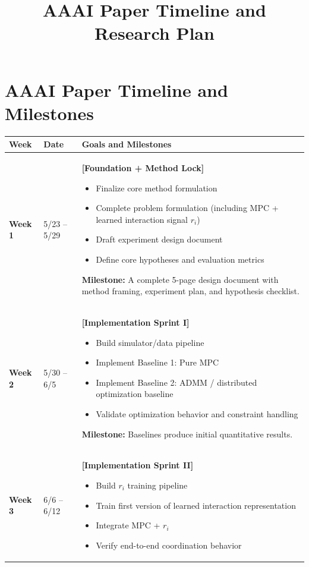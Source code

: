 \documentclass[11pt]{article}
\title{AAAI Paper Timeline and Research Plan}
\author{}
\date{}
\begin{document}
\maketitle

\section*{AAAI Paper Timeline and Milestones}

\begin{longtable}{p{1.8cm} p{2.3cm} p{10.5cm}}
\toprule
\textbf{Week} & \textbf{Date} & \textbf{Goals and Milestones} \\
\midrule
\endhead

\textbf{Week 1} & 5/23 -- 5/29 &
\textbf{[Foundation + Method Lock]}
\begin{itemize}[leftmargin=1.5em]
    \item Finalize core method formulation
    \item Complete problem formulation (including MPC + learned interaction signal $r_i$)
     \item Draft experiment design document
    \item Define core hypotheses and evaluation metrics
\end{itemize}

\textbf{Milestone:}
A complete 5-page design document with method framing, experiment plan, and hypothesis checklist.
\\

\midrule

\textbf{Week 2} & 5/30 -- 6/5 &
\textbf{[Implementation Sprint I]}
\begin{itemize}[leftmargin=1.5em]
    \item Build simulator/data pipeline
    \item Implement Baseline 1: Pure MPC
    \item Implement Baseline 2: ADMM / distributed optimization baseline
    \item Validate optimization behavior and constraint handling
\end{itemize}

\textbf{Milestone:}
Baselines produce initial quantitative results.
\\

\midrule

\textbf{Week 3} & 6/6 -- 6/12 &
\textbf{[Implementation Sprint II]}
\begin{itemize}[leftmargin=1.5em]
    \item Build $r_i$ training pipeline
    \item Train first version of learned interaction representation
    \item Integrate MPC + $r_i$
    \item Verify end-to-end coordination behavior
\end{itemize}


\end{longtable}
\end{document}
